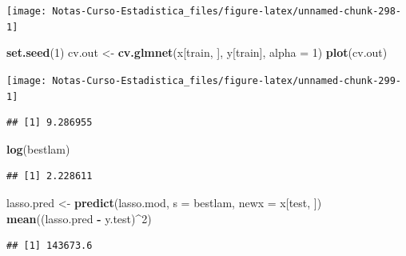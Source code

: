 \documentclass[
  12pt,
]{book}
\newenvironment{Shaded}{\begin{snugshade}}{\end{snugshade}}
\newcommand{\DataTypeTok}[1]{\textcolor[rgb]{0.13,0.29,0.53}{#1}}
\newcommand{\DecValTok}[1]{\textcolor[rgb]{0.00,0.00,0.81}{#1}}
\newcommand{\KeywordTok}[1]{\textcolor[rgb]{0.13,0.29,0.53}{\textbf{#1}}}
\newcommand{\NormalTok}[1]{#1}
\newcommand{\OperatorTok}[1]{\textcolor[rgb]{0.81,0.36,0.00}{\textbf{#1}}}
\newcommand{\StringTok}[1]{\textcolor[rgb]{0.31,0.60,0.02}{#1}}
\theoremstyle{definition}
\theoremstyle{definition}
\theoremstyle{definition}
\theoremstyle{remark}
\begin{document}
\begin{center}\texttt{[image: Notas-Curso-Estadistica\_files/figure-latex/unnamed-chunk-298-1]} \end{center}

\begin{Shaded}
\begin{Highlighting}[]
\KeywordTok{set.seed}\NormalTok{(}\DecValTok{1}\NormalTok{)}
\NormalTok{cv.out <-}\StringTok{ }\KeywordTok{cv.glmnet}\NormalTok{(x[train, ], y[train], }\DataTypeTok{alpha =} \DecValTok{1}\NormalTok{)}
\KeywordTok{plot}\NormalTok{(cv.out)}
\end{Highlighting}
\end{Shaded}

\begin{center}\texttt{[image: Notas-Curso-Estadistica\_files/figure-latex/unnamed-chunk-299-1]} \end{center}

\begin{Shaded}
\end{Shaded}

\begin{verbatim}
## [1] 9.286955
\end{verbatim}

\begin{Shaded}
\begin{Highlighting}[]
\KeywordTok{log}\NormalTok{(bestlam)}
\end{Highlighting}
\end{Shaded}

\begin{verbatim}
## [1] 2.228611
\end{verbatim}

\begin{Shaded}
\begin{Highlighting}[]
\NormalTok{lasso.pred <-}\StringTok{ }\KeywordTok{predict}\NormalTok{(lasso.mod, }\DataTypeTok{s =}\NormalTok{ bestlam, }\DataTypeTok{newx =}\NormalTok{ x[test, }
\NormalTok{    ])}
\KeywordTok{mean}\NormalTok{((lasso.pred }\OperatorTok{-}\StringTok{ }\NormalTok{y.test)}\OperatorTok{^}\DecValTok{2}\NormalTok{)}
\end{Highlighting}
\end{Shaded}

\begin{verbatim}
## [1] 143673.6
\end{verbatim}
\end{document}
